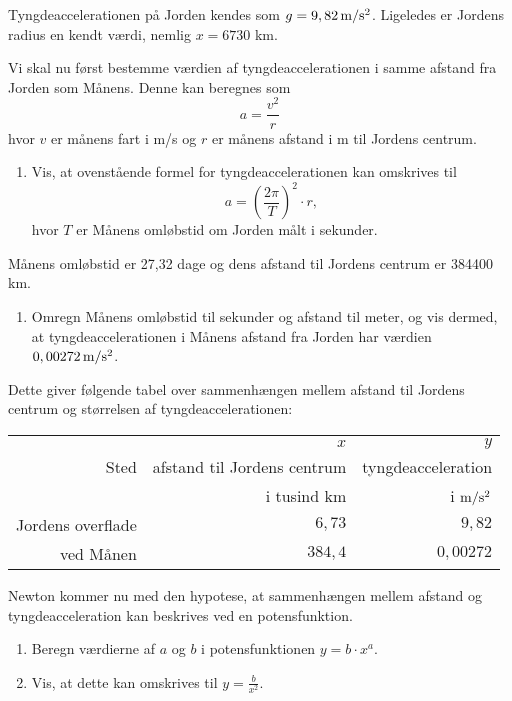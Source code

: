 \documentclass[12pt,oneside,a4paper]{article}
\newcommand{\be}{\begin{equation}}
\newcommand{\ee}{\end{equation}}
\theoremstyle{plain}
\begin{document}
Tyngdeaccelerationen på Jorden kendes som $g=9,82\, {\rm m}/{\rm s}^2$.
Ligeledes er Jordens radius en kendt værdi, nemlig $x=6730$ km.

Vi skal nu først bestemme værdien af tyngdeaccelerationen i samme afstand fra
Jorden som Månens.  Denne kan beregnes som
\be
a = \frac{v^2}{r}
\label{acc}
\ee
hvor $v$ er månens fart i m/s og $r$ er månens afstand i m til Jordens centrum. 

\begin{enumerate}[label=(\alph*)]
    \item Vis, at ovenstående formel for tyngdeaccelerationen kan omskrives til 
        $$
        a = \left(\frac{2\pi}{T}\right)^2 \cdot r,
        $$
        hvor $T$ er Månens omløbstid om Jorden målt i sekunder. \label{a}
\end{enumerate}

Månens omløbstid er 27,32 dage og dens afstand til Jordens centrum er 384400 km.

\begin{enumerate}[label=(\alph*) ,resume]
    \item Omregn Månens omløbstid til sekunder og afstand til meter, og vis
        dermed, at tyngdeaccelerationen i Månens afstand fra Jorden har værdien
        $0,00272\, {\rm m}/{\rm s}^2$.
\end{enumerate}

Dette giver følgende tabel over sammenhængen mellem afstand til Jordens centrum
og størrelsen af tyngdeaccelerationen:

\begin{center}
\begin{tabular}{r|r|r}
    \hline
          & $x$                         & $y$ \\
    Sted  & afstand til Jordens centrum & tyngdeacceleration   \\
          & i tusind km                 & i ${\rm m}/{\rm s}^2$  \\
    \hline 
    Jordens overflade & $6,73$  & $9,82$ \\
    ved Månen         & $384,4$ & $0,00272$ \\
    \hline 
\end{tabular}
\end{center}

Newton kommer nu med den hypotese, at sammenhængen mellem afstand og
tyngdeacceleration kan beskrives ved en potensfunktion.

\begin{enumerate}[label=(\alph*) ,resume]
    \item Beregn værdierne af $a$ og $b$ i potensfunktionen $y=b\cdot x^a$.
    \item Vis, at dette kan omskrives til $y=\frac{b}{x^2}$. \label{n}
\end{enumerate}
\end{document}

